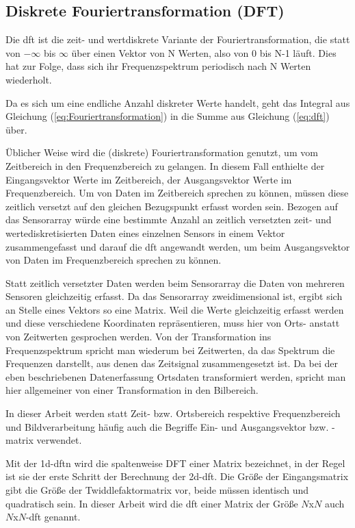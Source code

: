 \subsection{Diskrete Fouriertransformation (DFT)}

Die \gls{dft} ist die zeit- und wertdiskrete Variante der Fouriertransformation, die statt von $-\infty$ bis $\infty$ über einen Vektor von N Werten, also von 0 bis N-1 läuft. 
Dies hat zur Folge, dass sich ihr Frequenzspektrum periodisch nach N Werten wiederholt.

Da es sich um eine endliche Anzahl diskreter Werte handelt, geht das Integral aus Gleichung (\ref{eq:Fouriertransformation}) in die Summe aus Gleichung (\ref{eq:dft}) über. 


Üblicher Weise wird die (diskrete) Fouriertransformation genutzt, um vom Zeitbereich in den Frequenzbereich zu gelangen. In diesem Fall enthielte der Eingangsvektor 
Werte im Zeitbereich, der Ausgangsvektor Werte im Frequenzbereich.
Um von Daten im Zeitbereich sprechen zu können, müssen diese zeitlich versetzt auf den gleichen Bezugspunkt erfasst worden sein. 
Bezogen auf das Sensorarray würde eine bestimmte Anzahl an zeitlich versetzten zeit- und wertediskretisierten Daten eines einzelnen Sensors in einem Vektor zusammengefasst 
und darauf die \gls{dft} angewandt werden, um beim Ausgangsvektor von Daten im Frequenzbereich sprechen zu können.

Statt zeitlich versetzter Daten werden beim Sensorarray die Daten von mehreren Sensoren gleichzeitig erfasst. Da das Sensorarray zweidimensional ist, ergibt
sich an Stelle eines Vektors so eine Matrix. Weil die Werte gleichzeitig erfasst werden und diese verschiedene Koordinaten repräsentieren, muss hier von Orts- anstatt von
Zeitwerten gesprochen werden. Von der Transformation ins Frequenzspektrum spricht man wiederum bei Zeitwerten, da das Spektrum die Frequenzen darstellt, aus denen das Zeitsignal 
zusammengesetzt ist. Da bei der eben beschriebenen Datenerfassung Ortsdaten transformiert werden, spricht man hier allgemeiner von einer Transformation in den Bilbereich. 

In dieser Arbeit werden statt Zeit- bzw. Ortsbereich respektive Frequenzbereich und Bildverarbeitung häufig auch die Begriffe Ein- und Ausgangsvektor bzw. -matrix verwendet.

Mit der \gls{1d-dftn} wird die spaltenweise DFT einer Matrix bezeichnet, in der Regel ist sie der erste Schritt der Berechnung der \gls{2d-dft}. 
Die Größe der Eingangsmatrix gibt die Größe der Twiddlefaktormatrix vor, beide müssen identisch und
quadratisch sein. In dieser Arbeit wird die \gls{dft} einer Matrix der Größe $N$x$N$ auch $N$x$N$-\gls{dft} genannt.


